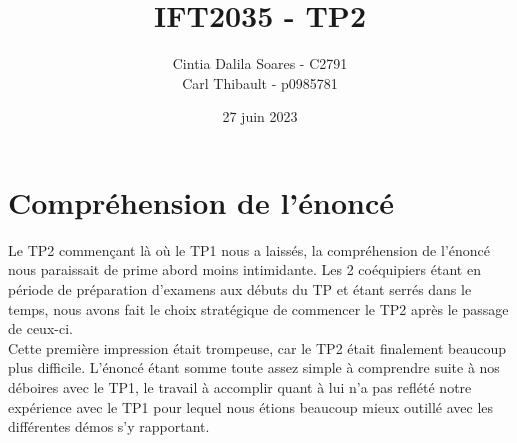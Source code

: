 \documentclass[11pt, letterpaper]{article}
\title{IFT2035 - TP2}
\author{Cintia Dalila Soares - C2791\\
  Carl Thibault - p0985781}
\date{27 juin 2023}
\begin{document}
 
 \maketitle
 
 
 
 
 
 
 
 
 \section{Compréhension de l'énoncé}
 
 Le TP2 commençant là où le TP1 nous a laissés, la compréhension de l'énoncé nous paraissait de prime abord moins intimidante. Les 2 coéquipiers étant en période de préparation d'examens aux débuts du TP et étant serrés dans le temps, nous avons fait le choix stratégique de commencer le TP2 après le passage de ceux-ci.\\
 
 Cette première impression était trompeuse, car le TP2 était finalement beaucoup plus difficile. L'énoncé étant somme toute assez simple à comprendre suite à nos déboires avec le TP1, le travail à accomplir quant à lui n'a pas reflété notre expérience avec le TP1 pour lequel nous étions beaucoup mieux outillé avec les différentes démos s'y rapportant.\\ 
 
\end{document}
